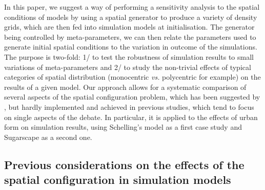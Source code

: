 \documentclass[Royal,sageh,times]{sagej}
\begin{document}
In this paper, we suggest a way of performing a sensitivity analysis to the spatial conditions of models by using a spatial generator to produce a variety of density grids, which are then fed into simulation models at initialisation. The generator being controlled by meta-parameters, we can then relate the parameters used to generate initial spatial conditions to the variation in outcome of the simulations. The purpose is two-fold: 1/ to test the robustness of simulation results to small variations of meta-parameters and 2/ to study the non-trivial effects of typical categories of spatial distribution (monocentric \textit{vs.} polycentric for example) on the results of a given model. Our approach allows for a systematic comparison of several aspects of the spatial configuration problem, which has been suggested by \citet{filatova2013spatial}, but hardly implemented and achieved in previous studies, which tend to focus on single aspects of the debate. In particular, it is applied to the effects of urban form on simulation results, using Schelling's model as a first case study and Sugarscape as a second one. 

\subsection{Previous considerations on the effects of the spatial configuration in simulation models}


\end{document}
